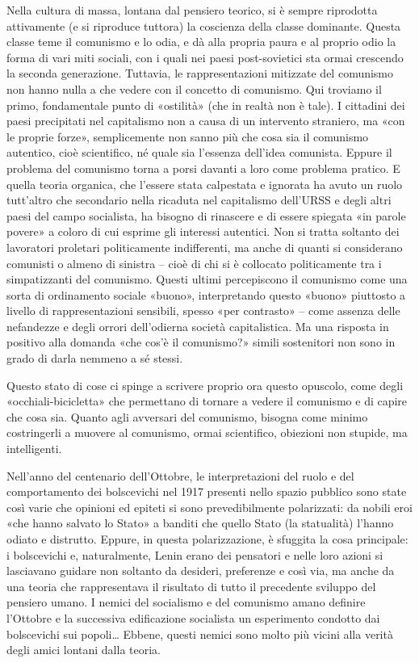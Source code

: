 \documentclass[12pt,a4paper,openany]{book}
\begin{document}
Nella cultura di massa, lontana dal pensiero teorico, si è sempre riprodotta attivamente (e si riproduce tuttora) la coscienza della classe dominante. Questa classe teme il comunismo e lo odia, e dà alla propria paura e al proprio odio la forma di vari miti sociali, con i quali nei paesi post-sovietici sta ormai crescendo la seconda generazione. Tuttavia, le rappresentazioni mitizzate del comunismo non hanno nulla a che vedere con il concetto di comunismo. Qui troviamo il primo, fondamentale punto di «ostilità» (che in realtà non è tale). I cittadini dei paesi precipitati nel capitalismo non a causa di un intervento straniero, ma «con le proprie forze», semplicemente non sanno più che cosa sia il comunismo autentico, cioè scientifico, né quale sia l'essenza dell'idea comunista. Eppure il problema del comunismo torna a porsi davanti a loro come problema pratico. E quella teoria organica, che l'essere stata calpestata e ignorata ha avuto un ruolo tutt'altro che secondario nella ricaduta nel capitalismo dell'URSS e degli altri paesi del campo socialista, ha bisogno di rinascere e di essere spiegata «in parole povere» a coloro di cui esprime gli interessi autentici. Non si tratta soltanto dei lavoratori proletari politicamente indifferenti, ma anche di quanti si considerano comunisti o almeno di sinistra – cioè di chi si è collocato politicamente tra i simpatizzanti del comunismo. Questi ultimi percepiscono il comunismo come una sorta di ordinamento sociale «buono», interpretando questo «buono» piuttosto a livello di rappresentazioni sensibili, spesso «per contrasto» – come assenza delle nefandezze e degli orrori dell'odierna società capitalistica. Ma una risposta in positivo alla domanda «che cos'è il comunismo?» simili sostenitori non sono in grado di darla nemmeno a sé stessi.

Questo stato di cose ci spinge a scrivere proprio ora questo opuscolo, come degli «occhiali-bicicletta» che permettano di tornare a vedere il comunismo e di capire che cosa sia. Quanto agli avversari del comunismo, bisogna come minimo costringerli a muovere al comunismo, ormai scientifico, obiezioni non stupide, ma intelligenti.

Nell'anno del centenario dell'Ottobre, le interpretazioni del ruolo e del comportamento dei bolscevichi nel 1917 presenti nello spazio pubblico sono state così varie che opinioni ed epiteti si sono prevedibilmente polarizzati: da nobili eroi «che hanno salvato lo Stato» a banditi che quello Stato (la statualità) l'hanno odiato e distrutto. Eppure, in questa polarizzazione, è sfuggita la cosa principale: i bolscevichi e, naturalmente, Lenin erano dei pensatori e nelle loro azioni si lasciavano guidare non soltanto da desideri, preferenze e così via, ma anche da una teoria che rappresentava il risultato di tutto il precedente sviluppo del pensiero umano. I nemici del socialismo e del comunismo amano definire l'Ottobre e la successiva edificazione socialista un esperimento condotto dai bolscevichi sui popoli… Ebbene, questi nemici sono molto più vicini alla verità degli amici lontani dalla teoria.
\end{document}
